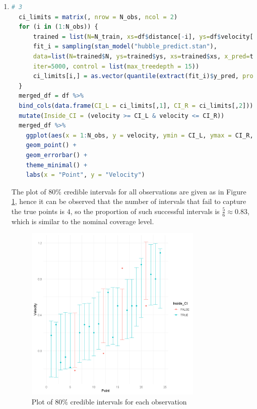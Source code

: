 \documentclass{article}
\begin{document}
\begin{enumerate}
\item 
\begin{lstlisting}[language=R]
  # 3
  ci_limits = matrix(, nrow = N_obs, ncol = 2)
  for (i in (1:N_obs)) {
      trained = list(N=N_train, xs=df$distance[-i], ys=df$velocity[-i], x_pred=df$distance[i])
      fit_i = sampling(stan_model("hubble_predict.stan"), 
      data=list(N=trained$N, ys=trained$ys, xs=trained$xs, x_pred=trained$x_pred), 
      iter=5000, control = list(max_treedepth = 15))
      ci_limits[i,] = as.vector(quantile(extract(fit_i)$y_pred, prob=c(0.1, 0.9)))
  }
  merged_df = df %>% 
  bind_cols(data.frame(CI_L = ci_limits[,1], CI_R = ci_limits[,2])) %>% 
  mutate(Inside_CI = (velocity >= CI_L & velocity <= CI_R)) 
  merged_df %>% 
    ggplot(aes(x = 1:N_obs, y = velocity, ymin = CI_L, ymax = CI_R, color=Inside_CI)) +
    geom_point() + 
    geom_errorbar() +
    theme_minimal() +
    labs(x = "Point", y = "Velocity")
\end{lstlisting}
The plot of $80\%$ credible intervals for all observations are given as in Figure \ref{fig:ci}, hence it can be observed that the number of intervals that fail to capture the true points is $4$, so the proportion of such successful intervals is $\frac56 \approx 0.83$, which is similar to the nominal coverage level.
\begin{figure}[H]
  \centering
  \includegraphics[width=0.8\textwidth, height=0.4\textheight]{ci.png}
  \caption{Plot of $80\%$ credible intervals for each observation}
  \label{fig:ci}
\end{figure}






\end{enumerate}









 
\end{document}
